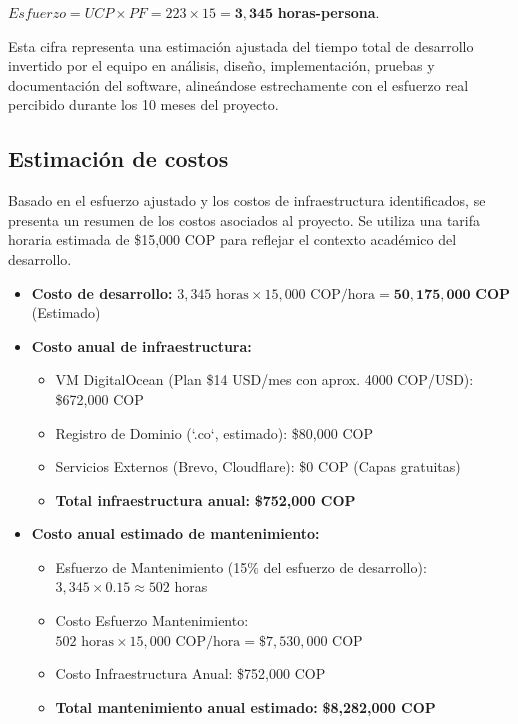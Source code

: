 $Esfuerzo = UCP \times PF = 223 \times 15 = \mathbf{3,345}$ \textbf{horas-persona}.

Esta cifra representa una estimación ajustada del tiempo total de desarrollo invertido por el equipo en análisis, diseño, implementación, pruebas y documentación del software, alineándose estrechamente con el esfuerzo real percibido durante los 10 meses del proyecto.

\subsection{Estimación de costos}
Basado en el esfuerzo ajustado y los costos de infraestructura identificados, se presenta un resumen de los costos asociados al proyecto. Se utiliza una tarifa horaria estimada de \$15,000 COP para reflejar el contexto académico del desarrollo.

\begin{itemize}
    \item \textbf{Costo de desarrollo:}
    $3,345 \text{ horas} \times 15,000 \text{ COP/hora} = \mathbf{50,175,000 \text{ COP}}$ (Estimado)

    \item \textbf{Costo anual de infraestructura:}
        \begin{itemize}
            \item VM DigitalOcean (Plan \$14 USD/mes con aprox. 4000 COP/USD): \$672,000 COP
            \item Registro de Dominio (`.co`, estimado): \$80,000 COP
            \item Servicios Externos (Brevo, Cloudflare): \$0 COP (Capas gratuitas)
            \item \textbf{Total infraestructura anual:} \textbf{\$752,000 COP}
        \end{itemize}

    \item \textbf{Costo anual estimado de mantenimiento:}
        \begin{itemize}
            \item Esfuerzo de Mantenimiento (15\% del esfuerzo de desarrollo): $3,345 \times 0.15 \approx 502$ horas
            \item Costo Esfuerzo Mantenimiento: $502 \text{ horas} \times 15,000 \text{ COP/hora} = \$7,530,000$ COP
            \item Costo Infraestructura Anual: \$752,000 COP
            \item \textbf{Total mantenimiento anual estimado:} \textbf{\$8,282,000 COP}
        \end{itemize}
\end{itemize}

